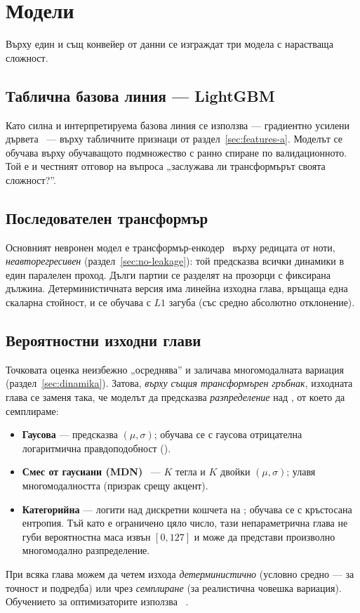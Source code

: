 \section{Модели}
\label{sec:modeli}

Върху един и същ конвейер от данни се изграждат три модела с нарастваща сложност.

\subsection{Таблична базова линия — LightGBM}
\label{sec:lightgbm}

Като силна и интерпретируема базова линия се използва  — градиентно
усилени дървета~\cite{ke2017lightgbm} — върху табличните признаци от
раздел~\ref{sec:features-a}. Моделът се обучава върху обучаващото подмножество с
ранно спиране по валидационното. Той е и честният отговор на въпроса „заслужава ли
трансформърът своята сложност?''.

\subsection{Последователен трансформър}
\label{sec:transformer}

Основният невронен модел е трансформър-енкодер~\cite{vaswani2017attention} върху
редицата от ноти, \emph{неавторегресивен} (раздел~\ref{sec:no-leakage}): той
предсказва всички динамики в един паралелен проход. Дълги партии се разделят на
прозорци с фиксирана дължина. Детерминистичната версия има линейна изходна глава,
връщаща една скаларна стойност, и се обучава с $L1$ загуба (със средно абсолютно
отклонение).

\subsection{Вероятностни изходни глави}
\label{sec:prob-heads}

Точковата оценка неизбежно „осреднява'' и заличава многомодалната вариация
(раздел~\ref{sec:dinamika}). Затова, \emph{върху същия трансформърен гръбнак},
изходната глава се заменя така, че моделът да предсказва \emph{разпределение} над
, от което да семплираме:
\begin{itemize}
  \item \textbf{Гаусова} — предсказва $(\mu,\sigma)$; обучава се с гаусова
        отрицателна логаритмична правдоподобност ().
  \item \textbf{Смес от гаусиани (MDN)}~\cite{bishop1994mdn} — $K$ тегла и $K$
        двойки $(\mu,\sigma)$; улавя многомодалността (призрак срещу акцент).
  \item \textbf{Категорийна} — логити над дискретни кошчета на ;
        обучава се с кръстосана ентропия. Тъй като  е ограничено
        цяло число, тази непараметрична глава не губи вероятностна маса извън
        $[0,127]$ и може да представи произволно многомодално разпределение.
\end{itemize}
При всяка глава можем да четем изхода \emph{детерминистично} (условно средно —
за точност и подредба) или чрез \emph{семплиране} (за реалистична човешка
вариация). Обучението за оптимизаторите използва ~\cite{kingma2015adam}.
